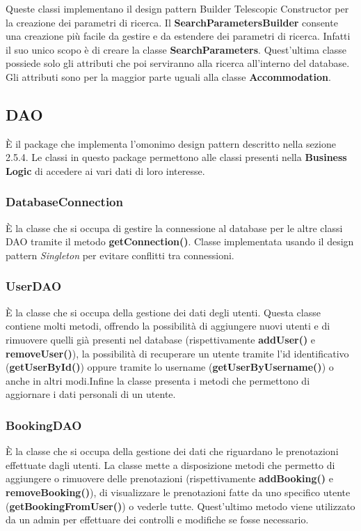 \documentclass[10pt]{article}
\begin{document}
Queste classi implementano il design pattern Builder Telescopic Constructor per la creazione dei parametri di ricerca. Il \textbf{SearchParametersBuilder} consente una creazione più facile da gestire e da estendere dei parametri di ricerca. Infatti il suo unico scopo è di creare la classe \textbf{SearchParameters}. Quest'ultima classe possiede solo gli attributi che poi serviranno alla ricerca all'interno del database. Gli attributi sono per la maggior parte uguali alla classe \textbf{Accommodation}.

\subsection{DAO}

\`E il package che implementa l'omonimo design pattern descritto nella sezione 2.5.4. Le classi in questo package permettono alle classi presenti nella \textbf{Business Logic} di accedere ai vari dati di loro interesse.

\subsubsection{DatabaseConnection}

\`E la classe che si occupa di gestire la connessione al database per le altre classi DAO tramite il metodo \textbf{getConnection()}. Classe implementata usando il design pattern \textit{Singleton} per evitare conflitti tra connessioni.

\subsubsection{UserDAO}

\`E la classe che si occupa della gestione dei dati degli utenti. Questa classe contiene molti metodi, offrendo la possibilità di aggiungere nuovi utenti e di rimuovere quelli già presenti nel database (rispettivamente \textbf{addUser()} e \textbf{removeUser()}), la possibilità di recuperare un utente tramite l'id identificativo (\textbf{getUserById()}) oppure tramite lo username (\textbf{getUserByUsername()}) o anche in altri modi.Infine la classe presenta i metodi che permettono di aggiornare i dati personali di un utente.

\subsubsection{BookingDAO}

\`E la classe che si occupa della gestione dei dati che riguardano le prenotazioni effettuate dagli utenti. La classe mette a disposizione metodi che permetto di aggiungere o rimuovere delle prenotazioni (rispettivamente \textbf{addBooking()} e \textbf{removeBooking()}), di visualizzare le prenotazioni fatte da uno specifico utente (\textbf{getBookingFromUser()}) o vederle tutte. Quest'ultimo metodo viene utilizzato da un admin per effettuare dei controlli e modifiche se fosse necessario.
\end{document}
